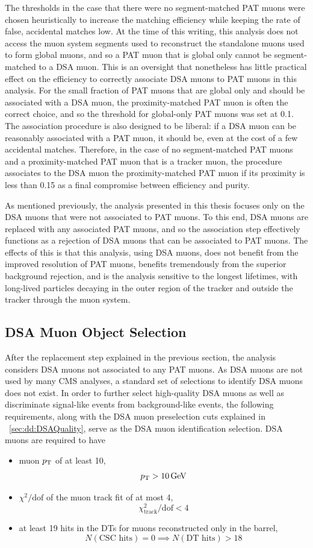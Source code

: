The \deltaR thresholds in the case that there were no segment-matched PAT muons were chosen heuristically to increase the matching efficiency while keeping the rate of false, accidental matches low.
At the time of this writing, this analysis does not access the muon system segments used to reconstruct the standalone muons used to form global muons, and so a PAT muon that is global only cannot be segment-matched to a DSA muon.
This is an oversight that nonetheless has little practical effect on the efficiency to correctly associate DSA muons to PAT muons in this analysis.
For the small fraction of PAT muons that are global only and should be associated with a DSA muon, the proximity-matched PAT muon is often the correct choice, and so the \deltaR threshold for global-only PAT muons was set at 0.1.
The association procedure is also designed to be liberal: if a DSA muon can be reasonably associated with a PAT muon, it should be, even at the cost of a few accidental matches.
Therefore, in the case of no segment-matched PAT muons and a proximity-matched PAT muon that is a tracker muon, the procedure associates to the DSA muon the proximity-matched PAT muon if its proximity \deltaR is less than 0.15 as a final compromise between efficiency and purity.

As mentioned previously, the analysis presented in this thesis focuses only on the DSA muons that were not associated to PAT muons.
To this end, DSA muons are replaced with any associated PAT muons, and so the association step effectively functions as a rejection of DSA muons that can be associated to PAT muons.
The effects of this is that this analysis, using DSA muons, does not benefit from the improved resolution of PAT muons, benefits tremendously from the superior background rejection, and is the analysis sensitive to the longest lifetimes, with long-lived particles decaying in the outer region of the tracker and outside the tracker through the muon system.

\subsection{DSA Muon Object Selection}
After the \DSAToPAT replacement step explained in the previous section, the analysis considers DSA muons not associated to any PAT muons.
As DSA muons are not used by many CMS analyses, a standard set of selections to identify DSA muons does not exist.
In order to further select high-quality DSA muons as well as discriminate signal-like events from background-like events, the following requirements, along with the DSA muon preselection cuts explained in \Sec~\ref{sec:dd:DSAQuality}, serve as the DSA muon identification selection.
DSA muons are required to have
\begin{itemize}
  \item muon $p_{\mathrm{T}}$ of at least 10\GeV, \ie $$p_{\mathrm{T}} > 10\,\text{Ge\hspace{-.08em}V}$$
  \item $\chi^2/\text{dof}$ of the muon track fit of at most 4, \ie $$\chi^2_\text{track}/\text{dof} < 4$$
  \item at least 19 hits in the DTs for muons reconstructed only in the barrel, \ie $$N(\text{CSC hits}) = 0 \implies N(\text{DT hits}) > 18$$
\end{itemize}

